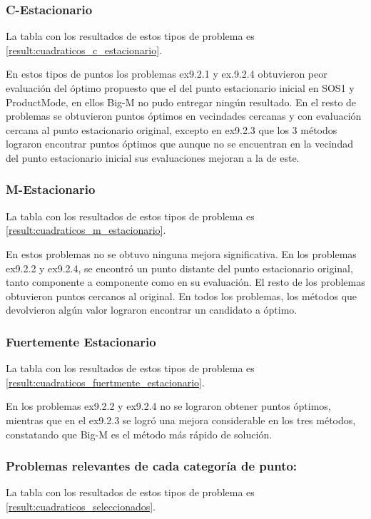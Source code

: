\subsubsection{C-Estacionario}   
La tabla con los resultados de estos tipos de problema es \ref{result:cuadraticos_c_estacionario}.

En estos tipos de puntos los problemas ex9.2.1 y ex.9.2.4 obtuvieron peor evaluación del óptimo propuesto que el del punto estacionario inicial en SOS1 y ProductMode, 
en ellos Big-M no pudo entregar ningún resultado. En el resto de problemas se obtuvieron puntos óptimos en vecindades cercanas y con evaluación cercana al punto estacionario original,
excepto en ex9.2.3 que los 3 métodos lograron encontrar puntos óptimos que aunque no se encuentran en la vecindad del punto estacionario inicial sus evaluaciones mejoran a la de este.


    
\subsubsection{M-Estacionario}
La tabla con los resultados de estos tipos de problema es \ref{result:cuadraticos_m_estacionario}.  

En estos problemas no se obtuvo ninguna mejora significativa. 
En los problemas ex9.2.2 y ex9.2.4, se encontró un punto distante del punto estacionario original, tanto componente a componente como en su evaluación. 
El resto de los problemas obtuvieron puntos cercanos al original. 
En todos los problemas, los métodos que devolvieron algún valor lograron encontrar un candidato a óptimo.
    
\subsubsection{Fuertemente Estacionario}
La tabla con los resultados de estos tipos de problema es \ref{result:cuadraticos_fuertmente_estacionario}.   

En los problemas ex9.2.2 y ex9.2.4 no se lograron obtener puntos óptimos, mientras que en el ex9.2.3 se logró una mejora considerable en los tres métodos, 
constatando que Big-M es el método más rápido de solución.

\subsubsection{Problemas relevantes de cada categoría de punto:}
La tabla con los resultados de estos tipos de problema es \ref{result:cuadraticos_seleccionados}.

